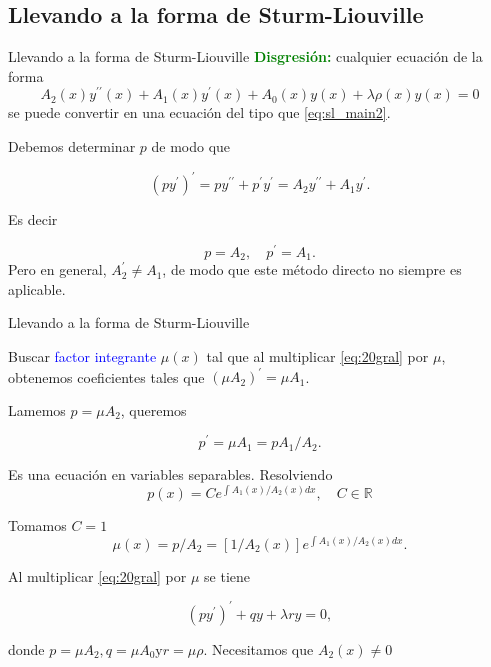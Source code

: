 \documentclass[xcolor=dvipsnames,a4paper,10pt,handout]{beamer}
\newcommand{\rr}{\mathbb{R}}
\renewcommand{\emph}[1]{\textcolor{blue}{#1}}
\renewcommand{\textbf}[1]{\textcolor{green}{\bfseries #1}}
\begin{document}
\subsection{Llevando a la forma de Sturm-Liouville}



 

\begin{frame}{Llevando a la forma de Sturm-Liouville}
\onslide<+->
\textbf{Disgresión:} cualquier ecuación de la forma 
\begin{equation}\label{eq:20gral}
    A_{2}(x) y^{\prime \prime}(x)+A_{1}(x) y^{\prime}(x)+A_{0}(x) y(x)+\lambda \rho(x) y(x)=0
\end{equation}
se puede convertir  en una ecuación del tipo que \eqref{eq:sl_main2}.


\onslide<+->
Debemos determinar $p$ de modo que 

$$\left(p y^{\prime}\right)^{\prime}=p y^{\prime \prime}+p^{\prime} y^{\prime}=A_{2} y^{\prime \prime}+A_{1}y^{\prime}.$$

Es decir 

$$p=A_{2},\quad p^{\prime}=A_{1}.$$
Pero en general, $A_{2}^{\prime} \neq A_{1}$, de modo que este método directo no siempre es aplicable.
\end{frame}

 



 

\begin{frame}{Llevando a la forma de Sturm-Liouville}

 Buscar
 \emph{factor integrante} $\mu(x)$ tal que al multiplicar \eqref{eq:20gral} por $\mu$,  obtenemos coeficientes tales que  $\left(\mu A_{2}\right)^{\prime}=\mu A_{1}$. 
 
 
 Lamemos $p=\mu A_{2}$,  queremos 
 
 $$p^{\prime}=\mu A_{1}=p A_{1} / A_{2}.$$
 
 Es una ecuación en variables separables. Resolviendo
$$
p(x)=C e^{\int A_{1}(x) / A_{2}( x) d x},\quad C\in\rr
$$

Tomamos $C=1$ 
$$\mu(x)=p / A_{2}=\left[1 / A_{2}(x)\right] e^{\int A_{1}(x) / A_{2}(x) d x}.$$

Al multiplicar \eqref{eq:20gral} por  $\mu$ se tiene

$$\left(p y^{\prime}\right)^{\prime}+q y+\lambda r y=0,$$

donde $p=\mu A_{2}, q=\mu A_{0} \mathrm{y} r=\mu \rho$. Necesitamos  que $A_{2}(x)\neq 0$

\end{frame}
\end{document}
